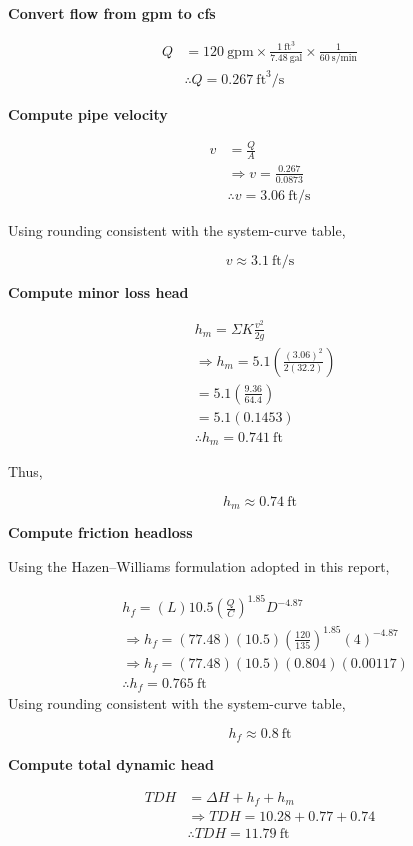 \textbf{Convert flow from gpm to cfs}

\[
\begin{aligned}
Q &= 120\ \text{gpm}\times 
\frac{1\ \text{ft}^3}{7.48\ \text{gal}}\times 
\frac{1}{60\ \text{s/min}} \\
&\therefore Q = 0.267\ \text{ft}^3/\text{s}
\end{aligned}
\]

\textbf{Compute pipe velocity}

\[
\begin{aligned}
v &= \frac{Q}{A} \\
&\Rightarrow v = \frac{0.267}{0.0873} \\
&\therefore v = 3.06\ \text{ft/s}
\end{aligned}
\]

Using rounding consistent with the system-curve table,

\[
v \approx 3.1\ \text{ft/s}
\]

\textbf{Compute minor loss head}

\[
\begin{aligned}
&h_m = \Sigma K\frac{v^2}{2g} \\
&\Rightarrow h_m = 5.1\left(\frac{(3.06)^2}{2(32.2)}\right) \\
&= 5.1\left(\frac{9.36}{64.4}\right) \\
&= 5.1(0.1453) \\
&\therefore h_m = 0.741\ \text{ft}
\end{aligned}
\]

Thus,

\[
h_m \approx 0.74\ \text{ft}
\]

\textbf{Compute friction headloss}

Using the Hazen--Williams formulation adopted in this report,

\[
\begin{aligned}
&h_f = (L)10.5\left(\frac{Q}{C}\right)^{1.85}D^{-4.87} \\
&\Rightarrow h_f = (77.48)(10.5)
\left(\frac{120}{135}\right)^{1.85}(4)^{-4.87} \\
&\Rightarrow h_f = (77.48)(10.5)(0.804)(0.00117) \\
&\therefore h_f = 0.765\ \text{ft}
\end{aligned}
\]
Using rounding consistent with the system-curve table,

\[
h_f \approx 0.8\ \text{ft}
\]

\textbf{Compute total dynamic head}

\[
\begin{aligned}
TDH &= \Delta H + h_f + h_m \\
&\Rightarrow TDH = 10.28 + 0.77 + 0.74 \\
&\therefore TDH = 11.79\ \text{ft}
\end{aligned}
\]

